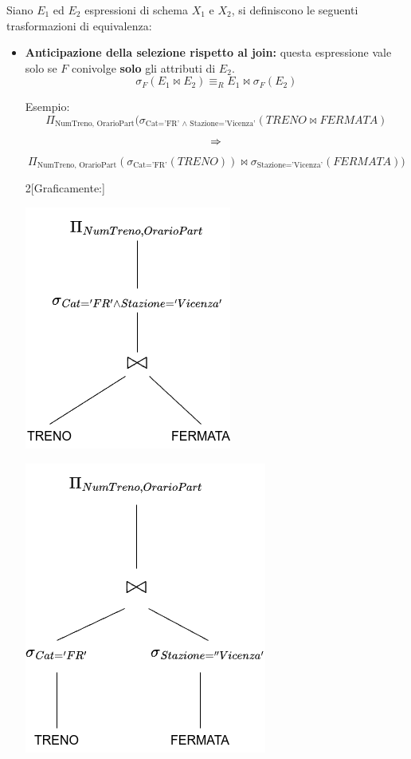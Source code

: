 \documentclass{report}
\begin{document}
\newpage
Siano $E_1$ ed $E_2$ espressioni di schema $X_1$ e $X_2$, si definiscono le seguenti trasformazioni di equivalenza:
\begin{itemize}
    \item \textbf{Anticipazione della selezione rispetto al join:} questa espressione vale solo se $F$ conivolge \textbf{solo} gli attributi di $E_2$.
\[ \sigma_{F}(E_1 \bowtie E_2) \equiv_R E_1 \bowtie \sigma_{F}(E_2) \]

Esempio:
\[ \Pi_{\text{NumTreno, OrarioPart}}(\sigma_{\text{Cat='FR' $\wedge$ Stazione='Vicenza'}}(TRENO \bowtie FERMATA) \]
\[ \Large \Rightarrow \]
\[ \Pi_{\text{NumTreno, OrarioPart}}(\sigma_{\text{Cat='FR'}}(TRENO)) \bowtie \sigma_{\text{Stazione='Vicenza'}}(FERMATA)) \]
\begin{multicols}{2}[Graficamente:]

\begin{center}\includegraphics[scale=0.45]{tree_example_transform}\end{center}
\begin{center}\includegraphics[scale=0.45]{tree_example_anticip_sel}\end{center}
\end{multicols}


\end{itemize}
\end{document}
